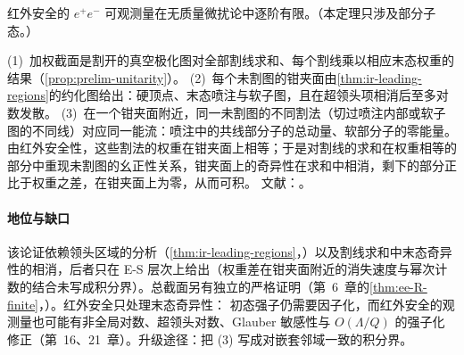 \begin{theorem}\label{thm:ir-safe-finite}
红外安全的 $e^+e^-$ 可观测量在无质量微扰论中逐阶有限。（本定理只涉及部分子态。）
\end{theorem}
\begin{proofsketch}
(1)~加权截面是割开的真空极化图对全部割线求和、每个割线乘以相应末态权重的结果（\cref{prop:prelim-unitarity}）。
(2)~每个未割图的钳夹面由\cref{thm:ir-leading-regions}的约化图给出：硬顶点、末态喷注与软子图，且在超领头项相消后至多对数发散。
(3)~在一个钳夹面附近，同一未割图的不同割法（切过喷注内部或软子图的不同线）对应同一能流：喷注中的共线部分子的总动量、软部分子的零能量。由红外安全性，这些割法的权重在钳夹面上相等；于是对割线的求和在权重相等的部分中重现未割图的幺正性关系，钳夹面上的奇异性在求和中相消，剩下的部分正比于权重之差，在钳夹面上为零，从而可积。
文献：\cite{Sterman1978a,Sterman1978b,Sterman:1979uw,StermanWeinberg1977,Ore:1979ry}。
\end{proofsketch}

\paragraph{地位与缺口}
该论证依赖领头区域的分析（\cref{thm:ir-leading-regions}，\tagA）以及割线求和中末态奇异性的相消，后者只在 E-S 层次上给出（权重差在钳夹面附近的消失速度与幂次计数的结合未写成积分界）\cite{Sterman1978a,Sterman1978b}。总截面另有独立的严格证明（第~6~章的\cref{thm:ee-R-finite}，\tagR）。红外安全只处理末态奇异性：%
初态强子仍需要因子化，而红外安全的观测量也可能有非全局对数、超领头对数、Glauber 敏感性与 $O(\Lambda/Q)$ 的强子化修正（第~16、21~章）。升级途径：把 (3) 写成对嵌套邻域一致的积分界。
